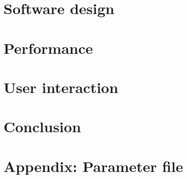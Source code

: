\documentclass[%
 aip,
superscriptaddress,
 amsmath,amssymb,
preprint,%
]{revtex4-2}
\begin{document}
\section{\label{sec:level4}Software design}



\section{\label{sec:level5}Performance}



\section{\label{sec:level6}User interaction}


\section{\label{sec:level7}Conclusion}


\section{Appendix: Parameter file}




\end{document}
